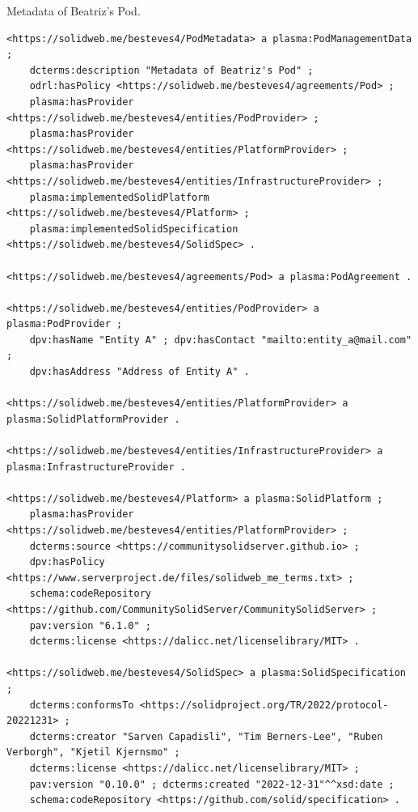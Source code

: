 \begin{listing}[htp]
\caption{Metadata of Beatriz's Pod.}
\label{list:plasma_PodManagementData}
\begin{verbatim}
<https://solidweb.me/besteves4/PodMetadata> a plasma:PodManagementData ;
    dcterms:description "Metadata of Beatriz's Pod" ;
    odrl:hasPolicy <https://solidweb.me/besteves4/agreements/Pod> ;
    plasma:hasProvider <https://solidweb.me/besteves4/entities/PodProvider> ;
    plasma:hasProvider <https://solidweb.me/besteves4/entities/PlatformProvider> ;
    plasma:hasProvider <https://solidweb.me/besteves4/entities/InfrastructureProvider> ;
    plasma:implementedSolidPlatform <https://solidweb.me/besteves4/Platform> ;
    plasma:implementedSolidSpecification <https://solidweb.me/besteves4/SolidSpec> .

<https://solidweb.me/besteves4/agreements/Pod> a plasma:PodAgreement .

<https://solidweb.me/besteves4/entities/PodProvider> a plasma:PodProvider ;
    dpv:hasName "Entity A" ; dpv:hasContact "mailto:entity_a@mail.com" ;
    dpv:hasAddress "Address of Entity A" .

<https://solidweb.me/besteves4/entities/PlatformProvider> a plasma:SolidPlatformProvider .

<https://solidweb.me/besteves4/entities/InfrastructureProvider> a plasma:InfrastructureProvider .

<https://solidweb.me/besteves4/Platform> a plasma:SolidPlatform ;
    plasma:hasProvider <https://solidweb.me/besteves4/entities/PlatformProvider> ;
    dcterms:source <https://communitysolidserver.github.io> ;
    dpv:hasPolicy <https://www.serverproject.de/files/solidweb_me_terms.txt> ;
    schema:codeRepository <https://github.com/CommunitySolidServer/CommunitySolidServer> ;
    pav:version "6.1.0" ;
    dcterms:license <https://dalicc.net/licenselibrary/MIT> .

<https://solidweb.me/besteves4/SolidSpec> a plasma:SolidSpecification ;
    dcterms:conformsTo <https://solidproject.org/TR/2022/protocol-20221231> ;
    dcterms:creator "Sarven Capadisli", "Tim Berners-Lee", "Ruben Verborgh", "Kjetil Kjernsmo" ;
    dcterms:license <https://dalicc.net/licenselibrary/MIT> ;
    pav:version "0.10.0" ; dcterms:created "2022-12-31"^^xsd:date ;
    schema:codeRepository <https://github.com/solid/specification> .
\end{verbatim}
\end{listing}

